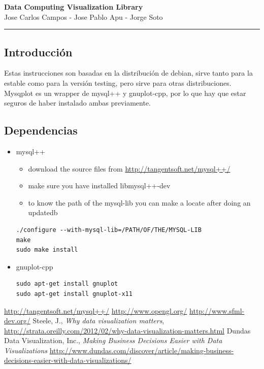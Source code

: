 \documentclass[11pt]{article}
\begin{document}
\begin{center}
{ \huge \bfseries Data Computing Visualization Library }\\[0.2cm]
{ Jose Carlos Campos - Jose Pablo Apu - Jorge Soto }\\[0.2cm]
\rule{\linewidth}{0.25mm}
\end{center}

\subsection*{Introducción}
Estas instrucciones son basadas en la distribución de debian, sirve tanto para la estable como para la versión testing, pero sirve para otras distribuciones. Mysqplot es un wrapper de mysql++ y gnuplot-cpp, por lo que hay que estar seguros de haber instalado ambas previamente. 

\subsection*{Dependencias}
\begin{itemize}
\item mysql++\\
\begin{itemize}
\item download the source files from \url{http://tangentsoft.net/mysql++/}
\item make sure you have installed libmysql++-dev
\item to know the path of the mysql-lib you can make a locate after doing an updatedb
\end{itemize}
\begin{lstlisting}
./configure --with-mysql-lib=/PATH/OF/THE/MYSQL-LIB
make
sudo make install
\end{lstlisting}
\item gnuplot-cpp\\

\begin{lstlisting}
sudo apt-get install gnuplot
sudo apt-get install gnuplot-x11
\end{lstlisting}
\end{itemize}
\begin{thebibliography}{10}
\url{http://tangentsoft.net/mysql++/}
\url{http://www.opengl.org/}
\url{http://www.sfml-dev.org/}
Steele, J., \textit{Why data visualization matters}, 
		\url{http://strata.oreilly.com/2012/02/why-data-visualization-matters.html}
Dundas Data Visualization, Inc., \textit{Making Business Decisions Easier with Data Visualizations}
		\url{http://www.dundas.com/discover/article/making-business-decisions-easier-with-data-visualizations/}
\end{thebibliography}
\end{document}
